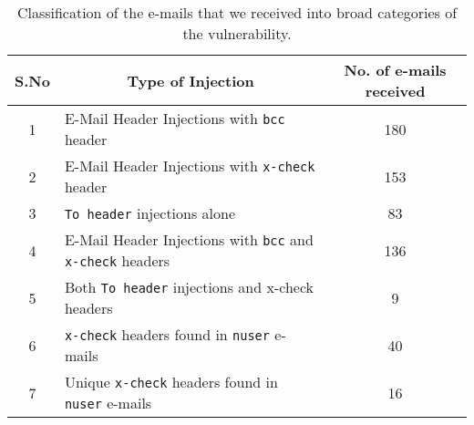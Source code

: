 \begin{table}[!htbp]
	\centering
	\begin{tabular}{|c|l|c|}
		\hline
		\multicolumn{1}{|c|}{\textbf{S.No}} &
		\multicolumn{1}{c|}{\textbf{Type of Injection}} &
		\multicolumn{1}{p{3cm}|}{\centering \textbf{No. of e-mails received}}\\
		\hline
		1 & E-Mail Header Injections with \texttt{bcc} header & 180\\
		\hline
		2 & E-Mail Header Injections with \texttt{x-check} header & 153\\
		\hline
		3 & \texttt{To header} injections alone & 83\\
		\hline
		4 & E-Mail Header Injections with \texttt{bcc} and \texttt{x-check} headers & 136\\
		\hline
		5 & Both \texttt{To header} injections and x-check headers & 9\\
		\hline
		6 & \texttt{x-check} headers found in \texttt{nuser} e-mails & 40\\
		\hline
		7 & Unique \texttt{x-check} headers found in \texttt{nuser} e-mails & 16\\
		\hline
	\end{tabular}
	\caption[]{Classification of the e-mails that we received into broad categories of the vulnerability.}
	\label{tab:analysis}
\end{table}